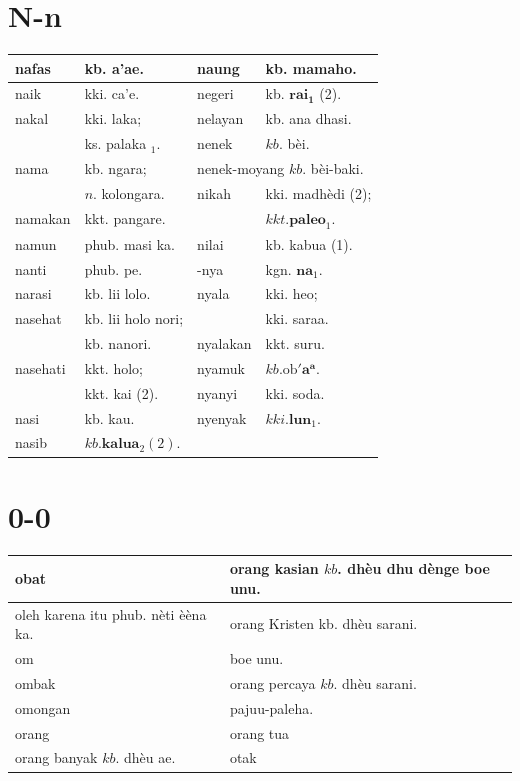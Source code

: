 \documentclass[10pt]{article}
\begin{document}
\section*{N-n}
\begin{center}
\begin{tabular}{|l|l|l|l|}
\hline
nafas & kb. a'ae. & naung & kb. mamaho. \\
\hline
naik & kki. ca'e. & negeri & kb. \(\mathbf{r a i}_{\mathbf{1}}\) (2). \\
\hline
nakal & kki. laka; & nelayan & kb. ana dhasi. \\
\hline
 & ks. palaka \({ }_{1}\). & nenek & \(k b\). bèi. \\
\hline
nama & kb. ngara; & \multicolumn{2}{|l|}{nenek-moyang \(k b\). bèi-baki.} \\
\hline
 & \(n\). kolongara. & nikah & kki. madhèdi (2); \\
\hline
namakan & kkt. pangare. &  & \(k k t . \mathbf{p a l e o}_{1}\). \\
\hline
namun & phub. masi ka. & nilai & kb. kabua (1). \\
\hline
nanti & phub. pe. & -nya & kgn. \(\mathbf{n a}_{1}\). \\
\hline
narasi & kb. lii lolo. & nyala & kki. heo; \\
\hline
nasehat & kb. lii holo nori; &  & kki. saraa. \\
\hline
 & kb. nanori. & nyalakan & kkt. suru. \\
\hline
nasehati & kkt. holo; & nyamuk & \(k b . \mathrm{ob} ' \mathbf{a}^{\mathbf{a}}\). \\
\hline
 & kkt. kai (2). & nyanyi & kki. soda. \\
\hline
nasi & kb. kau. & nyenyak & \(k k i . \mathbf{l u n}_{1}\). \\
\hline
nasib & \(k b . \mathbf{k a l u a}_{2}(2)\). &  &  \\
\hline
\end{tabular}
\end{center}

\section*{0-0}
\begin{center}
\begin{tabular}{|l|l|}
\hline
obat & orang kasian \(k b\). dhèu dhu dènge boe unu. \\
\hline
oleh karena itu phub. nèti èèna ka. & orang Kristen kb. dhèu sarani. \\
\hline
om & boe unu. \\
\hline
ombak & orang percaya \(k b\). dhèu sarani. \\
\hline
omongan & pajuu-paleha. \\
\hline
orang & orang tua \\
\hline
orang banyak \(k b\). dhèu ae. & otak \\
\hline
\end{tabular}
\end{center}
\end{document}
